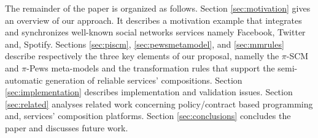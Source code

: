 The remainder of the paper is organized as follows. Section \ref{sec:motivation} gives an overview of our approach. It describes a motivation example that integrates and synchronizes well-known social networks services namely Facebook, Twitter and, Spotify. Sections \ref{sec:piscm}, \ref{sec:pewsmetamodel}, and \ref{sec:mmrules} describe respectively the three key elements of our proposal, namelly the $\pi$-SCM and $\pi$-{\sc Pews} meta-models and the transformation rules that support the semi-automatic generation of reliable services' compositions.
%
Section \ref{sec:implementation} describes implementation and validation issues.
Section \ref{sec:related} analyses related work concerning policy/contract based programming and, services' composition platforms. Section \ref{sec:conclusions} concludes the paper and discusses future work.








